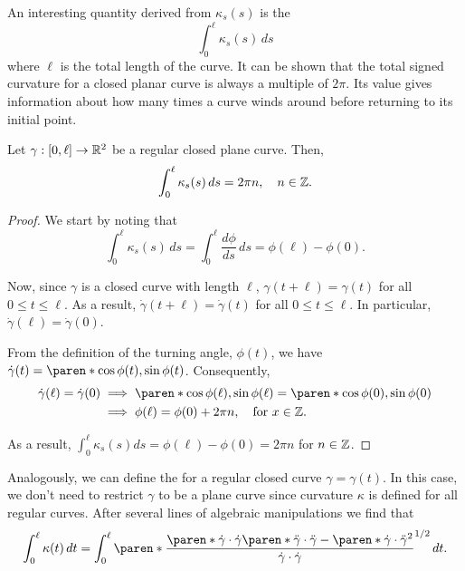 \documentclass[11pt]{penrose}
\begin{document}
An interesting quantity derived from $\kappa_s(s)$ is the 
\begin{equation}
    \int_0^\ell \kappa_s (s) \,ds
\end{equation}
where $\ell$ is the total length of the curve. It can be shown that the total signed curvature for a closed planar curve is always a multiple of $2\pi$. Its value gives information about how many times a curve winds around before returning to its initial point.

\begin{nprop}
    Let $\gamma : [0, \ell] \to \mathbb{R}^2$ be a regular closed plane curve. Then,
    \begin{equation}
        \int_0^\ell \kappa_s (s) \,ds = 2\pi n,
        \quad n \in \mathbb{Z}.
    \end{equation}
\end{nprop}
\begin{proof}
    We start by noting that
    \begin{equation}
        \int_0^\ell \kappa_s (s) \,ds
        = \int_0^\ell \frac{d\phi}{ds} \,ds
        = \phi(\ell) - \phi(0).
    \end{equation}

    Now, since $\gamma$ is a closed curve with length $\ell$, $\gamma(t + \ell) = \gamma(t)$ for all $0 \leq t \leq \ell$. As a result, $\dot{\gamma}(t + \ell) = \dot{\gamma}(t)$ for all $0 \leq t \leq \ell$. In particular, $\dot{\gamma}(\ell) = \dot{\gamma}(0)$.

    From the definition of the turning angle, $\phi(t)$, we have $\dot{\gamma}(t) = \paren*{ \cos\phi(t), \sin\phi(t) }$. Consequently,
    \begin{align}
        \dot{\gamma}(\ell) = \dot{\gamma}(0)
        &\implies \paren*{ \cos\phi(\ell), \sin\phi(\ell) } = \paren*{ \cos\phi(0), \sin\phi(0) }\\
        &\implies \phi(\ell) = \phi(0) + 2\pi n, \quad\text{for } x \in \Z.
    \end{align}

    As a result, $\int_0^\ell \kappa_s (s) ds = \phi(\ell) - \phi(0) = 2\pi n$ for $n \in \mathbb{Z}$.
\end{proof}

Analogously, we can define the  for a regular closed curve $\gamma = \gamma(t)$. In this case, we don't need to restrict $\gamma$ to be a plane curve since curvature $\kappa$ is defined for all regular curves. After several lines of algebraic manipulations we find that
\begin{equation}
    \int_0^\ell \kappa(t) \,dt
    = \int_{0}^{\ell} \paren*{ \frac{ \paren*{\dot{\gamma}\cdot\dot{\gamma}}\paren*{\ddot{\gamma}\cdot\ddot{\gamma}} - \paren*{\dot{\gamma}\cdot\ddot{\gamma}}^2 }{ \dot{\gamma}\cdot\dot{\gamma} } }^{1/2} \,dt.
\end{equation}
\end{document}
